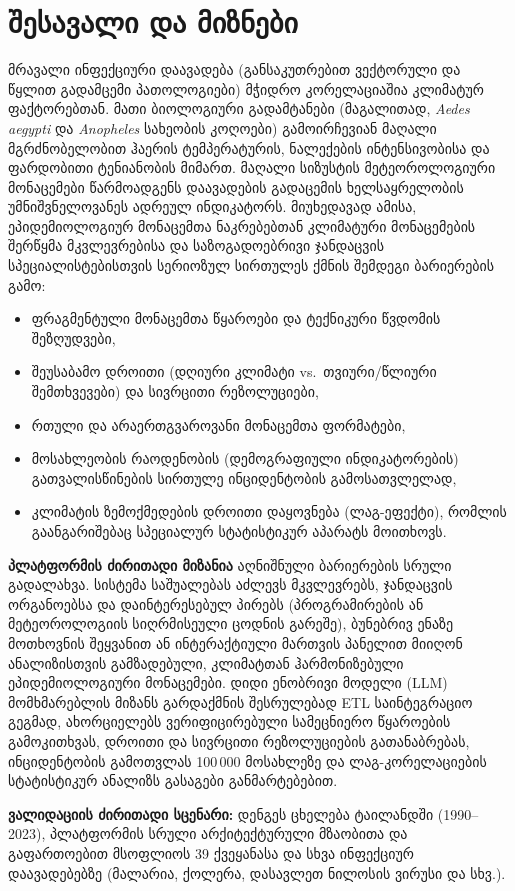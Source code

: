 \documentclass[11pt,a4paper]{article}
\begin{document}
\section{შესავალი და მიზნები}

მრავალი ინფექციური დაავადება (განსაკუთრებით ვექტორული და წყლით გადამცემი პათოლოგიები) მჭიდრო კორელაციაშია კლიმატურ ფაქტორებთან. მათი ბიოლოგიური გადამტანები (მაგალითად, {\latinfont\itshape Aedes aegypti} და {\latinfont\itshape Anopheles} სახეობის კოღოები) გამოირჩევიან მაღალი მგრძნობელობით ჰაერის ტემპერატურის, ნალექების ინტენსივობისა და ფარდობითი ტენიანობის მიმართ. მაღალი სიზუსტის მეტეოროლოგიური მონაცემები წარმოადგენს დაავადების გადაცემის ხელსაყრელობის უმნიშვნელოვანეს ადრეულ ინდიკატორს. მიუხედავად ამისა, ეპიდემიოლოგიურ მონაცემთა ნაკრებებთან კლიმატური მონაცემების შერწყმა მკვლევრებისა და საზოგადოებრივი ჯანდაცვის სპეციალისტებისთვის სერიოზულ სირთულეს ქმნის შემდეგი ბარიერების გამო:
\begin{itemize}[leftmargin=1.5em]
  \item ფრაგმენტული მონაცემთა წყაროები და ტექნიკური წვდომის შეზღუდვები,
  \item შეუსაბამო დროითი (დღიური კლიმატი vs.\ თვიური/წლიური შემთხვევები) და სივრცითი რეზოლუციები,
  \item რთული და არაერთგვაროვანი მონაცემთა ფორმატები,
  \item მოსახლეობის რაოდენობის (დემოგრაფიული ინდიკატორების) გათვალისწინების სირთულე ინციდენტობის გამოსათვლელად,
  \item კლიმატის ზემოქმედების დროითი დაყოვნება (ლაგ-ეფექტი), რომლის გაანგარიშებაც სპეციალურ სტატისტიკურ აპარატს მოითხოვს.
\end{itemize}

\textbf{პლატფორმის ძირითადი მიზანია} აღნიშნული ბარიერების სრული გადალახვა. სისტემა საშუალებას აძლევს მკვლევრებს, ჯანდაცვის ორგანოებსა და დაინტერესებულ პირებს (პროგრამირების ან მეტეოროლოგიის სიღრმისეული ცოდნის გარეშე), ბუნებრივ ენაზე მოთხოვნის შეყვანით ან ინტერაქტიული მართვის პანელით მიიღონ ანალიზისთვის გამზადებული, კლიმატთან ჰარმონიზებული ეპიდემიოლოგიური მონაცემები. დიდი ენობრივი მოდელი (LLM) მომხმარებლის მიზანს გარდაქმნის შესრულებად ETL საინტეგრაციო გეგმად, ახორციელებს ვერიფიცირებული სამეცნიერო წყაროების გამოკითხვას, დროითი და სივრცითი რეზოლუციების გათანაბრებას, ინციდენტობის გამოთვლას 100\,000 მოსახლეზე და ლაგ-კორელაციების სტატისტიკურ ანალიზს გასაგები განმარტებებით.

\textbf{ვალიდაციის ძირითადი სცენარი:} დენგეს ცხელება ტაილანდში (1990--2023), პლატფორმის სრული არქიტექტურული მზაობითა და გაფართოებით მსოფლიოს 39 ქვეყანასა და სხვა ინფექციურ დაავადებებზე (მალარია, ქოლერა, დასავლეთ ნილოსის ვირუსი და სხვ.).
\end{document}
